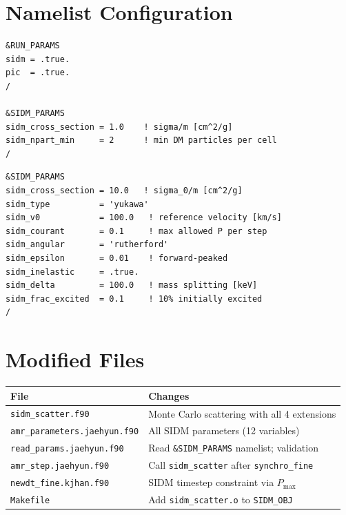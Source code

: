 \documentclass[11pt,fleqn]{book}
\begin{document}
\section{Namelist Configuration}

\begin{codebox}[SIDM basic example ($\sigma/m = 1\,$cm$^2$/g, isotropic elastic)]
\begin{lstlisting}[style=fortran,numbers=none]
&RUN_PARAMS
sidm = .true.
pic  = .true.
/

&SIDM_PARAMS
sidm_cross_section = 1.0    ! sigma/m [cm^2/g]
sidm_npart_min     = 2      ! min DM particles per cell
/
\end{lstlisting}
\end{codebox}

\begin{codebox}
\begin{lstlisting}[style=fortran,numbers=none]
&SIDM_PARAMS
sidm_cross_section = 10.0   ! sigma_0/m [cm^2/g]
sidm_type          = 'yukawa'
sidm_v0            = 100.0   ! reference velocity [km/s]
sidm_courant       = 0.1     ! max allowed P per step
sidm_angular       = 'rutherford'
sidm_epsilon       = 0.01    ! forward-peaked
sidm_inelastic     = .true.
sidm_delta         = 100.0   ! mass splitting [keV]
sidm_frac_excited  = 0.1     ! 10% initially excited
/
\end{lstlisting}
\end{codebox}

\section{Modified Files}

\begin{longtable}{L{6.5cm} L{7cm}}
\toprule
\textbf{File} & \textbf{Changes} \\
\midrule
\endhead
\texttt{sidm\_scatter.f90} & Monte Carlo scattering with all 4 extensions \\
\texttt{amr\_parameters.jaehyun.f90} & All SIDM parameters (12 variables) \\
\texttt{read\_params.jaehyun.f90} & Read \texttt{\&SIDM\_PARAMS} namelist; validation \\
\texttt{amr\_step.jaehyun.f90} & Call \texttt{sidm\_scatter} after \texttt{synchro\_fine} \\
\texttt{newdt\_fine.kjhan.f90} & SIDM timestep constraint via $P_{\max}$ \\
\texttt{Makefile} & Add \texttt{sidm\_scatter.o} to \texttt{SIDM\_OBJ} \\
\bottomrule
\end{longtable}
\end{document}
